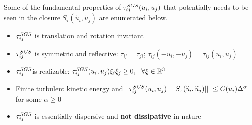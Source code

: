 Some of the fundamental properties of $\tau^{\tiny SGS}_{ij}(u_i,u_j)$ that potentially needs to be seen in the closure $S_{\tau}(\widetilde{u}_i,\widetilde{u}_j)$ are enumerated below.
\begin{itemize}
\item $\tau^{\tiny SGS}_{ij}$ is translation and rotation invariant
\item $\tau^{\tiny SGS}_{ij}$ is symmetric and reflective: $\tau_{ij} = \tau_{ji}$; $\tau_{ij}(-u_i,-u_j) = \tau_{ij}(u_i,u_j) $
\item $\tau^{\tiny SGS}_{ij}$is realizable: $\tau^{\tiny SGS}_{ij}(u_i,u_j)\xi_i\xi_j \geq 0, \ \ \forall \xi \in \mathbb{R}^{3}$ 
\item Finite turbulent kinetic energy and $\vert\vert \tau^{\tiny SGS}_{ij}(u_i,u_j) - S_{\tau}(\widetilde{u}_i,\widetilde{u}_j)   \vert\vert \ \leq C(u_i)\Delta^{\alpha}$ for some $\alpha \geq 0$
\item $\tau^{\tiny SGS}_{ij}$ is essentially dispersive and \textbf{not dissipative} in nature
\end{itemize}

